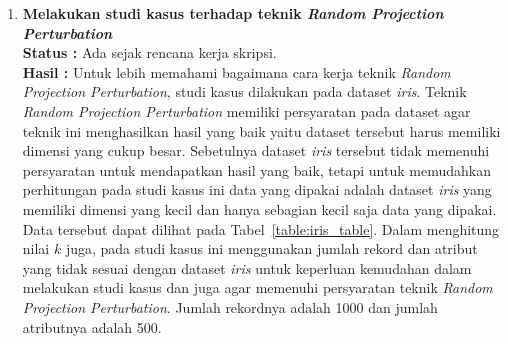 \documentclass[a4paper,twoside]{article}
\begin{document}
\begin{enumerate}
		\item \textbf{Melakukan studi kasus terhadap teknik \textit{Random Projection Perturbation}}\\
		{\bf Status :} Ada sejak rencana kerja skripsi.\\
		{\bf Hasil :} Untuk lebih memahami bagaimana cara kerja teknik \textit{Random Projection Perturbation}, studi kasus dilakukan pada dataset \textit{iris}. Teknik \textit{Random Projection Perturbation} memiliki persyaratan pada dataset agar teknik ini menghasilkan hasil yang baik yaitu dataset tersebut harus memiliki dimensi yang cukup besar. Sebetulnya dataset \textit{iris} tersebut tidak memenuhi persyaratan untuk mendapatkan hasil yang baik, tetapi untuk memudahkan perhitungan pada studi kasus ini data yang dipakai adalah dataset \textit{iris} yang memiliki dimensi yang kecil dan hanya sebagian kecil saja data yang dipakai. Data tersebut dapat dilihat pada Tabel~\ref{table:iris_table}. Dalam menghitung nilai \(k\) juga, pada studi kasus ini menggunakan jumlah rekord dan atribut yang tidak sesuai dengan dataset \textit{iris} untuk keperluan kemudahan dalam melakukan studi kasus dan juga agar memenuhi persyaratan teknik \textit{Random Projection Perturbation}. Jumlah rekordnya adalah 1000 dan jumlah atributnya adalah 500.


\end{enumerate}
\end{document}
